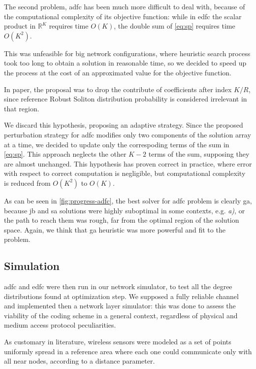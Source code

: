 \documentclass[12pt,journal,draftclsnofoot,onecolumn]{IEEEtran}
\begin{document}
\smallbreak
The second problem, \gls{adfc} has been much more difficult to deal with, because of the computational complexity of its objective function: while in \gls{edfc} the scalar product in $\mathbb{R}^K$ requires time $O(K)$, the double sum of \autoref{eq:sp} requires time $O(K^2)$.

This was unfeasible for big network configurations, where heuristic search process took too long to obtain a solution in reasonable time, so we decided to speed up the process at the cost of an approximated value for the objective function.

In paper\cite{Lin2007}, the proposal was to drop the contribute of coefficients after index $K/R$, since reference Robust Soliton distribution probability is considered irrelevant in that region.

We discard this hypothesis, proposing an adaptive strategy.
Since the proposed perturbation strategy for \gls{adfc} modifies only two components of the solution array at a time, we decided to update only the correspoding terms of the sum in \autoref{eq:sp}.
This approach neglects the other $K-2$ terms of the sum, supposing they are almost unchanged.
This hypothesis has proven correct in practice, where error with respect to correct computation is negligible, but computational complexity is reduced from $O(K^2)$ to $O(K)$.

As can be seen in \autoref{fig:progress-adfc}, the best solver for \gls{adfc} problem is clearly \gls{ga}, because \gls{jb} and \gls{sa} solutions were highly suboptimal in some contexts, e.g. \emph{a)}, or the path to reach them was rough, far from the optimal region of the solution space.
Again, we think that \gls{ga} heuristic was more powerful and fit to the problem.

\subsection{Simulation}
\gls{adfc} and \gls{edfc} were then run in our network simulator, to test all the degree distributions found at optimization step.
We supposed a fully reliable channel and implemented then a network layer simulator: this was done to assess the viability of the coding scheme in a general context, regardless of physical and medium access protocol peculiarities.

As customary in literature, wireless sensors were modeled as a set of points uniformly spread in a reference area where each one could communicate only with all near nodes, according to a distance parameter.
\end{document}
